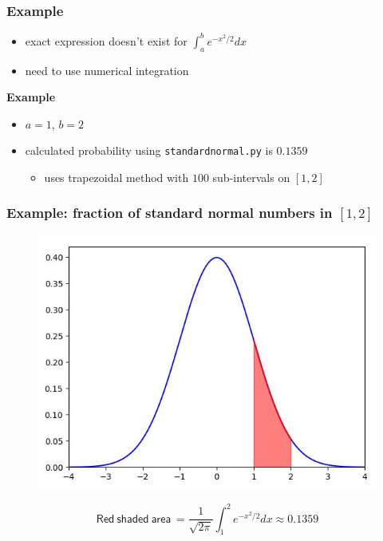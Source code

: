 \documentclass[english,14pt]{beamer}
\begin{document}

\begin{frame}[fragile]

\frametitle{Example}

\begin{itemize}
	\item exact expression doesn't exist for $\int_a^b e^{-x^2/2} dx$
	\item need to use numerical integration
\end{itemize}

\textbf{Example}

\begin{itemize}
	\item $a = 1$, $b = 2$
	\item calculated probability using \texttt{standardnormal.py} is $0.1359$
	\begin{itemize}
		\item uses trapezoidal method with $100$ sub-intervals on $[1,2]$
	\end{itemize}
\end{itemize}

\end{frame}


\begin{frame}[fragile]

\frametitle{Example: fraction of standard normal numbers in $[1,2]$}

\vspace*{-2mm}
\begin{figure}[ht]
	\centering
	\includegraphics[width=.6\textwidth]{figures/stdnormal_12}
\end{figure}
\vspace*{-3mm}
\[
\mathsf{Red~shaded~area~} = \frac{1}{\sqrt{2\pi}} \int_1^2 e^{-x^2/2} dx \approx 0.1359
\]

\end{frame}
\end{document}
